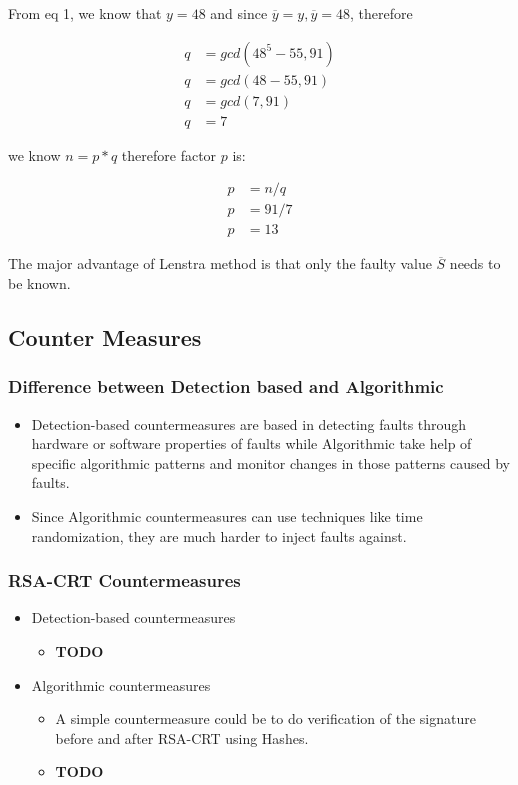 \documentclass[1p,16pt]{elsarticle}
\begin{document}
From eq 1, we know that $y=48$ and since
$\overline{y} = y, \overline{y} = 48$, therefore

\begin{align}
	q &= gcd(48^5 - 55, 91) \\
	q &= gcd(48 - 55, 91) \\
	q &= gcd(7, 91) \\
	q &= 7
\end{align}

we know $n = p * q$ therefore factor $p$ is:

\begin{align}
	p &= n / q \\
	p &= 91 / 7 \\
	p &= 13
\end{align}

The major advantage of Lenstra method is that only the faulty value $\overline{S}$ needs to be known.



\subsection{Counter Measures}%
\label{sub:counter_measures}

\subsubsection{Difference between Detection based and Algorithmic}%
\label{sub:difference_between_detection_based_and_algorithmic}
\begin{itemize}
	\item Detection-based countermeasures are based in detecting faults through hardware or software properties
		of faults while Algorithmic take help of specific algorithmic patterns and monitor changes in those
		patterns caused by faults.
	\item Since Algorithmic countermeasures can use techniques like time randomization, they are much harder
		to inject faults against.
\end{itemize}

\subsubsection{RSA-CRT Countermeasures}%
\label{sub:rsa_crt_countermeasures}
\begin{itemize}
	\item Detection-based countermeasures
		\begin{itemize}
			\item \textbf{TODO}
		\end{itemize}
	\item Algorithmic countermeasures
		\begin{itemize}
			\item A simple countermeasure could be to do verification of the signature before and after
				RSA-CRT using Hashes.
			\item \textbf{TODO}
		\end{itemize}
\end{itemize}
\end{document}
